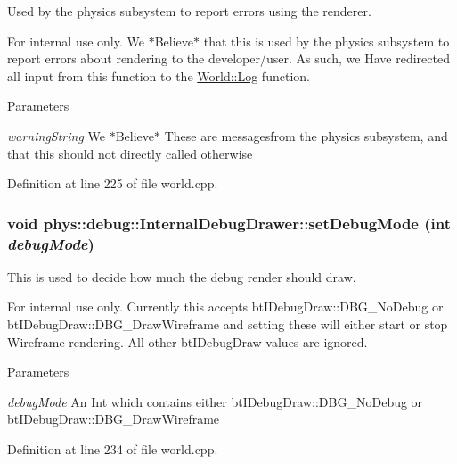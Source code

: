 Used by the physics subsystem to report errors using the renderer. 

\begin{DoxyInternal}{For internal use only.}
We $\ast$Believe$\ast$ that this is used by the physics subsystem to report errors about rendering to the developer/user. As such, we Have redirected all input from this function to the \hyperlink{classphys_1_1World_a05267a20e8d5518771d0848190b33d60}{World::Log} function. 
\begin{DoxyParams}{Parameters}
\item[{\em warningString}]We $\ast$Believe$\ast$ These are messagesfrom the physics subsystem, and that this should not directly called otherwise \end{DoxyParams}
\end{DoxyInternal}


Definition at line 225 of file world.cpp.

\hypertarget{classphys_1_1debug_1_1InternalDebugDrawer_a63059b273ed6031a393b2d994b820bcc}{
\subsubsection[{setDebugMode}]{\setlength{\rightskip}{0pt plus 5cm}void phys::debug::InternalDebugDrawer::setDebugMode (int {\em debugMode})}}
\label{db/d27/classphys_1_1debug_1_1InternalDebugDrawer_a63059b273ed6031a393b2d994b820bcc}


This is used to decide how much the debug render should draw. 

\begin{DoxyInternal}{For internal use only.}
Currently this accepts btIDebugDraw::DBG\_\-NoDebug or btIDebugDraw::DBG\_\-DrawWireframe and setting these will either start or stop Wireframe rendering. All other btIDebugDraw values are ignored. 
\begin{DoxyParams}{Parameters}
\item[{\em debugMode}]An Int which contains either btIDebugDraw::DBG\_\-NoDebug or btIDebugDraw::DBG\_\-DrawWireframe \end{DoxyParams}
\end{DoxyInternal}


Definition at line 234 of file world.cpp.

